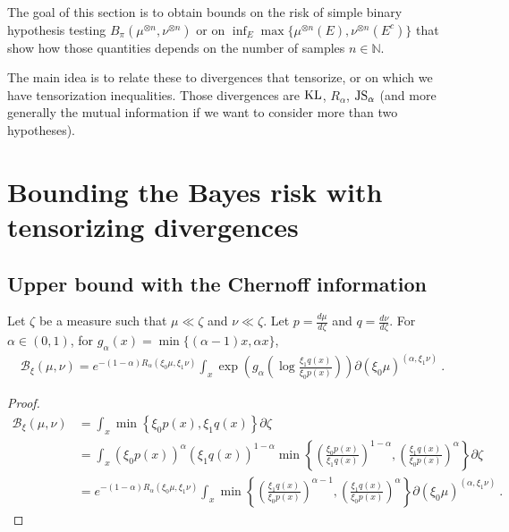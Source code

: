 
The goal of this section is to obtain bounds on the risk of simple binary hypothesis testing $B_\pi(\mu^{\otimes n}, \nu^{\otimes n})$ or on $\inf_{E} \max\{\mu^{\otimes n}(E), \nu^{\otimes n}(E^c)\}$ that show how those quantities depends on the number of samples $n \in \mathbb{N}$.

The main idea is to relate these to divergences that tensorize, or on which we have tensorization inequalities. Those divergences are $\operatorname{KL}$, $R_\alpha$, $\operatorname{JS}_\alpha$ (and more generally the mutual information if we want to consider more than two hypotheses).



\section{Bounding the Bayes risk with tensorizing divergences}

\subsection{Upper bound with the Chernoff information}

\begin{lemma}
  \label{lem:bayesBinaryRisk_eq_exp_renyi_mul_integral}
  Let $\zeta$ be a measure such that $\mu \ll \zeta$ and $\nu \ll \zeta$. Let $p = \frac{d \mu}{d\zeta}$ and $q = \frac{d \nu}{d\zeta}$.
  For $\alpha \in (0,1)$, for $g_\alpha(x) = \min\{(\alpha-1)x, \alpha x\}$,
  \begin{align*}
  \mathcal B_\xi(\mu, \nu)
  = e^{-(1 - \alpha) R_\alpha(\xi_0\mu, \xi_1\nu)} \int_x \exp \left(g_\alpha\left( \log \frac{\xi_1 q(x)}{\xi_0 p(x)} \right)\right) \partial(\xi_0\mu)^{(\alpha, \xi_1\nu)}
  \: .
  \end{align*}
\end{lemma}

\begin{proof}%
{}
\begin{align*}
\mathcal B_\xi(\mu, \nu)
&= \int_x \min \left\{\xi_0 p(x), \xi_1 q(x)\right\} \partial\zeta
\\
&= \int_x (\xi_0 p(x))^\alpha (\xi_1 q(x))^{1-\alpha} \min \left\{ \left(\frac{\xi_0p(x)}{\xi_1q(x)}\right)^{1 - \alpha}, \left(\frac{\xi_1q(x)}{\xi_0p(x)}\right)^\alpha\right\} \partial\zeta
\\
&= e^{-(1 - \alpha) R_\alpha(\xi_0\mu, \xi_1\nu)} \int_x \min \left\{ \left(\frac{\xi_1q(x)}{\xi_0p(x)}\right)^{\alpha - 1}, \left(\frac{\xi_1q(x)}{\xi_0p(x)}\right)^\alpha\right\} \partial(\xi_0\mu)^{(\alpha, \xi_1\nu)}
\: .
\end{align*}
\end{proof}


